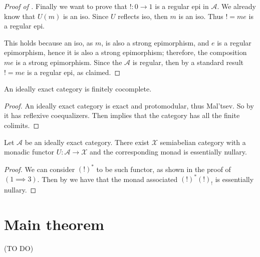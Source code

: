 \begin{subbox}{}
\begin{proof}[\textit{Proof of }]
    Finally we want to prove that $!:0 \to 1$ is a regular epi in $\mathcal{A}$. We already know that $U(m)$ is an iso. Since $U$ reflects iso, then $m$ is an iso. Thus $! = me$ is a regular epi.
    
    This holds because an iso, as $m$, is also a strong epimorphism, and $e$ is a regular epimorphism, hence it is also a strong epimorphism; therefore, the composition $me$ is a strong epimorphism. Since the $\mathcal{A}$ is regular, then by a standard result $!=me$ is a regular epi, as claimed.
    
\end{proof}
\end{subbox}

\begin{mainbox}{}
\begin{prop}
    An ideally exact category is finitely cocomplete.
\end{prop}
\end{mainbox}

\begin{subbox}{}
    \begin{proof}
        An ideally exact category is exact and protomodular, thus Mal'tsev. So by  it has reflexive coequalizers. Then  implies that the category has all the finite colimits.
    \end{proof}
\end{subbox}

\begin{mainbox}{}
\begin{prop}\label{ideally exact has essentially nullary monad}
    Let $\mathcal{A}$ be an ideally exact category.
    There exist $\mathcal{X}$ semiabelian category with a monadic functor $U: \mathcal{A} \to \mathcal{X}$ and the corresponding monad is essentially nullary.
\end{prop}
\end{mainbox}

\begin{subbox}{}
    \begin{proof}
        We can consider $(!)^*$ to be such functor, as shown in the proof of  $(1\implies3)$. Then by  we have that the monad associated $(!)^*(!)_!$ is essentially nullary.
    \end{proof}
\end{subbox}

\section{Main theorem}

(TO DO)